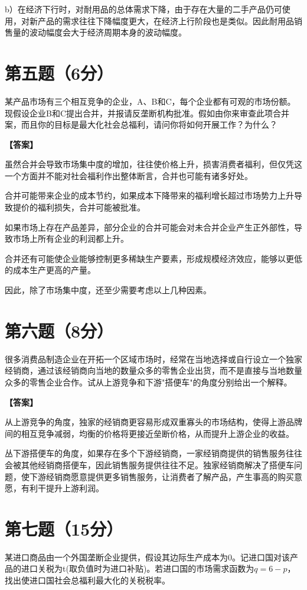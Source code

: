 \documentclass[12pt]{article}
\begin{document}
b）在经济下行时，对耐用品的总体需求下降，由于存在大量的二手产品仍可使用，对新产品的需求往往下降幅度更大，在经济上行阶段也是类似。因此耐用品销售量的波动幅度会大于经济周期本身的波动幅度。

\section*{第五题（6分）}
某产品市场有三个相互竞争的企业，A、B和C，每个企业都有可观的市场份额。现假设企业B和C提出合并，并报请反垄断机构批准。假如由你来审查此项合并案，而且你的目标是最大化社会总福利，请问你将如何开展工作？为什么？

\noindent\textbf{【答案】}

虽然合并会导致市场集中度的增加，往往使价格上升，损害消费者福利，但仅凭这一个方面并不能对社会福利作出整体断言，合并也可能有诸多好处。

合并可能带来企业的成本节约，如果成本下降带来的福利增长超过市场势力上升导致提价的福利损失，合并可能被批准。

如果市场上存在产品差异，部分企业的合并可能会对未合并企业产生正外部性，导致市场上所有企业的利润都上升。

合并还有可能使企业能够控制更多稀缺生产要素，形成规模经济效应，能够以更低的成本生产更高的产量。

因此，除了市场集中度，还至少需要考虑以上几种因素。

\section*{第六题（8分）}
很多消费品制造企业在开拓一个区域市场时，经常在当地选择或自行设立一个独家经销商，通过该经销商向当地的数量众多的零售企业出货，而不是直接与当地数量众多的零售企业合作。试从上游竞争和下游"搭便车"的角度分别给出一个解释。

\noindent\textbf{【答案】}

从上游竞争的角度，独家的经销商更容易形成双重寡头的市场结构，使得上游品牌间的相互竞争减弱，均衡的价格将更接近垒断价格，从而提升上游企业的收益。

丛下游搭便车的角度，如果存在多个下游经销商，一家经销商提供的销售服务往往会被其他经销商搭便车，因此销售服务提供往往不足。独家经销商解决了搭便车问题，使下游经销商愿意提供更多销售服务，让消费者了解产品，产生事高的购买意愿，有利干提升上游利润。

\section*{第七题（15分）}
某进口商品由一个外国垄断企业提供，假设其边际生产成本为0。记进口国对该产品的进口关税为t(取负值时为进口补贴)。若进口国的市场需求函数为$q=6-p$，找出使进口国社会总福利最大化的关税税率。
\end{document}

